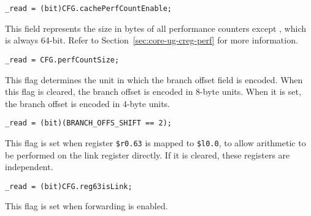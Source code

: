 \reset{*}
\implementation{}
\begin{lstlisting}
_read = (bit)CFG.cachePerfCountEnable;
\end{lstlisting}

This field represents the size in bytes of all performance counters except
, which is always 64-bit. Refer to Section~\ref{sec:core-ug-creg-perf}
for more information.

\reset{***}
\implementation{}
\begin{lstlisting}
_read = CFG.perfCountSize;
\end{lstlisting}

This flag determines the unit in which the branch offset field is encoded. When
this flag is cleared, the branch offset is encoded in 8-byte units. When it is
set, the branch offset is encoded in 4-byte units.

\reset{*}
\implementation{}
\begin{lstlisting}
_read = (bit)(BRANCH_OFFS_SHIFT == 2);
\end{lstlisting}

This flag is set when register \texttt{\$r0.63} is mapped to \texttt{\$l0.0}, to
allow arithmetic to be performed on the link register directly. If it is
cleared, these registers are independent.

\reset{*}
\implementation{}
\begin{lstlisting}
_read = (bit)CFG.reg63isLink;
\end{lstlisting}

This flag is set when forwarding is enabled.

